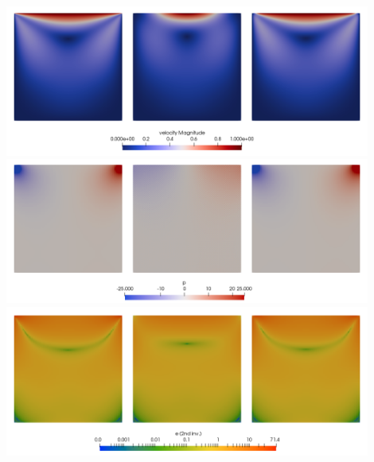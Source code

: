 \begin{center}
\includegraphics[width=12cm]{python_codes/fieldstone_04/results/velocities}\\
\includegraphics[width=12cm]{python_codes/fieldstone_04/results/pressures}\\
\includegraphics[width=12cm]{python_codes/fieldstone_04/results/strainrates}
\end{center}

